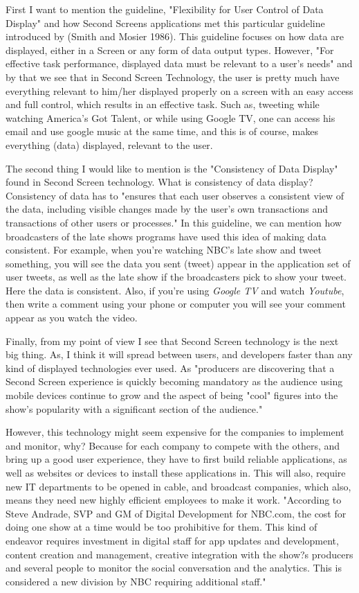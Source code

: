 \documentclass[12pt, oneside]{amsart}   	%
\begin{document}
 First I want to mention the guideline, "Flexibility for User Control of Data Display" and how Second Screens applications met this particular guideline introduced by (Smith and Mosier 1986).  This guideline focuses on how data are displayed, either in a Screen or any form of data output types.  However, "For effective task performance, displayed data must be relevant to a user's needs"\cite{Guideline} and by that we see that in Second Screen Technology, the user is pretty much have everything relevant to him/her displayed properly on a screen with an easy access and full control, which results in an effective task.  Such as, tweeting while watching America's Got Talent, or while using Google TV, one can access his email and use google music at the same time, and this is of course, makes everything (data) displayed, relevant to the user. 

 The second thing I would like to mention is the "Consistency of Data Display" found in Second Screen technology.  What is consistency of data display?   Consistency of data has to "ensures that each user observes a consistent view of the data, including visible changes made by the user's own transactions and transactions of other users or processes."\cite{guidline2} In this guideline, we can mention how broadcasters of the late shows programs have used this idea of making data consistent.  For example, when you're watching NBC's late show and tweet something, you will see the data you sent (tweet) appear in the application set of user tweets, as well as the late show if the broadcasters pick to show your tweet.  Here the data is consistent.  Also, if you're using  \emph{Google TV} and watch  \emph{Youtube}, then write a comment using your phone or computer you will see your comment appear as you watch the video.


Finally, from my point of view I see that Second Screen technology is the next big thing.  As, I think it will spread between users, and developers faster than any kind of displayed technologies ever used. As "producers are discovering that a Second Screen experience is quickly becoming mandatory as the audience using mobile devices continue to grow and the aspect of being "cool" figures into the show's popularity with a significant section of the audience."\cite{Second-Screen-Art}

 However, this technology might seem expensive for the companies to implement and monitor, why?  Because for each company to compete with the others, and bring up a good user experience, they have to first build reliable applications, as well as websites or devices to install these applications in.  This will also, require new IT departments to be opened in cable, and broadcast companies, which also, means they need new highly efficient employees to make it work.  "According to Steve Andrade, SVP and GM of Digital Development for NBC.com, the cost for doing one show at a time would be too prohibitive for them. This kind of endeavor requires investment in digital staff for app updates and development, content creation and management, creative integration with the show?s producers and several people to monitor the social conversation and the analytics. This is considered a new division by NBC requiring additional staff." \cite{Second-Screen-Art}
\end{document}
